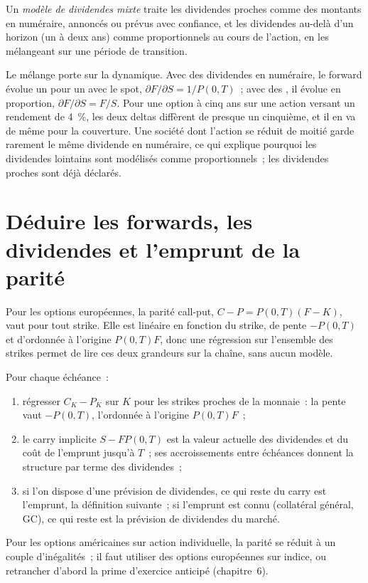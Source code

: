 \begin{definition}\label{def:dv:dividends-borrow-and-forwards:mixed}
Un \emph{modèle de dividendes mixte} traite les dividendes proches comme
des montants en numéraire, annoncés ou prévus avec confiance, et les dividendes au-delà d'un horizon
(un à deux ans) comme proportionnels au cours de l'action, en les mélangeant
sur une période de transition.
\end{definition}

Le mélange porte sur la dynamique. Avec des dividendes en numéraire, le forward évolue un pour un
avec le spot, $\partial F/\partial S=1/P(0,T)$~; avec des , il
évolue en proportion, $\partial F/\partial S=F/S$. Pour une option à cinq ans sur une action
versant un rendement de 4~\%, les deux deltas diffèrent de presque un cinquième, et il en va de même pour la couverture. Une société
dont l'action se réduit de moitié garde rarement le même dividende en numéraire, ce qui explique pourquoi les dividendes lointains
sont modélisés comme proportionnels~; les dividendes proches sont déjà déclarés.

\section{Déduire les forwards, les dividendes et l'emprunt de la parité}

Pour les options européennes, la parité call-put, $C-P=P(0,T)(F-K)$, vaut pour tout strike.
Elle est linéaire en fonction du strike, de pente $-P(0,T)$ et d'ordonnée à l'origine $P(0,T)F$, donc une
régression sur l'ensemble des strikes permet de lire ces deux grandeurs sur la chaîne, sans aucun modèle.

\begin{method}\label{met:dv:dividends-borrow-and-forwards:read}
Pour chaque échéance~:
\begin{enumerate}
\item régresser $C_K-P_K$ sur $K$ pour les strikes proches de la monnaie~: la pente vaut
$-P(0,T)$, l'ordonnée à l'origine $P(0,T)F$~;
\item le carry implicite $S-FP(0,T)$ est la valeur actuelle des dividendes et du coût
de l'emprunt jusqu'à $T$~; ses accroissements entre échéances donnent la structure par terme des dividendes~;
\item si l'on dispose d'une prévision de dividendes, ce qui reste du carry est l'emprunt, la
définition suivante~; si l'emprunt est connu (collatéral général, GC), ce qui reste est la
prévision de dividendes du marché.
\end{enumerate}
Pour les options américaines sur action individuelle, la parité se réduit à un couple d'inégalités~; il faut
utiliser des options européennes sur indice, ou retrancher d'abord la prime d'exercice anticipé (chapitre~6).
\end{method}

